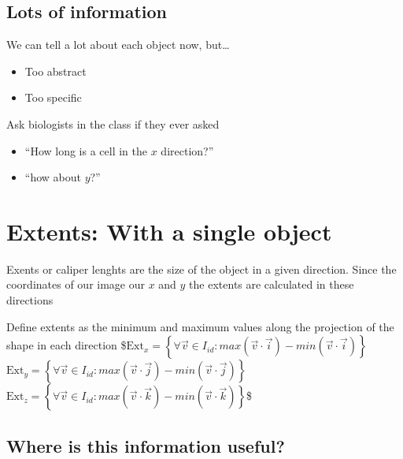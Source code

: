 \documentclass[letterpaper,10pt,english]{sphinxmanual}
\begin{document}
\subsection{Lots of information}
\label{\detokenize{06-ShapeAnalysis:lots-of-information}}
\sphinxAtStartPar
We can tell a lot about each object now, but…
\begin{itemize}
\item {} 
\sphinxAtStartPar
Too abstract

\item {} 
\sphinxAtStartPar
Too specific

\end{itemize}

\sphinxAtStartPar
Ask biologists in the class if they ever asked
\begin{itemize}
\item {} 
\sphinxAtStartPar
“How long is a cell in the \(x\) direction?”

\item {} 
\sphinxAtStartPar
“how about \(y\)?”

\end{itemize}


\section{Extents: With a single object}
\label{\detokenize{06-ShapeAnalysis:extents-with-a-single-object}}
\sphinxAtStartPar
Exents or caliper lenghts are the size of the object in a given direction. Since the coordinates of our image our \(x\) and \(y\) the extents are calculated in these directions

\sphinxAtStartPar
Define extents as the minimum and maximum values along the projection of the shape in each direction
\$\( \text{Ext}_x = \left\{ \forall \vec{v}\in I_{id}: max(\vec{v}\cdot\vec{i})-min(\vec{v}\cdot\vec{i})  \right\} \)\(
\)\( \text{Ext}_y = \left\{ \forall \vec{v}\in I_{id}: max(\vec{v}\cdot\vec{j})-min(\vec{v}\cdot\vec{j})  \right\} \)\(
\)\( \text{Ext}_z = \left\{ \forall \vec{v}\in I_{id}: max(\vec{v}\cdot\vec{k})-min(\vec{v}\cdot\vec{k})  \right\} \)\$


\subsection{Where is this information useful?}
\label{\detokenize{06-ShapeAnalysis:where-is-this-information-useful}}
\end{document}
